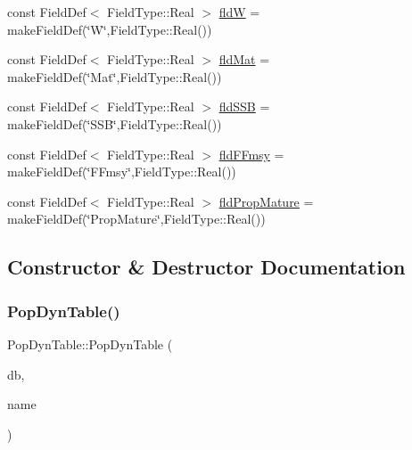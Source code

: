 \begin{DoxyCompactItemize}
\item 
const Field\+Def$<$ Field\+Type\+::\+Real $>$ \mbox{\hyperlink{class_pop_dyn_table_ab53c52a14f297070f8d9425d4ac48a71}{fldW}} = make\+Field\+Def(\char`\"{}W\char`\"{},Field\+Type\+::\+Real())
\item 
const Field\+Def$<$ Field\+Type\+::\+Real $>$ \mbox{\hyperlink{class_pop_dyn_table_aa2b80bf86f409ef0f59a606948ed04e9}{fld\+Mat}} = make\+Field\+Def(\char`\"{}Mat\char`\"{},Field\+Type\+::\+Real())
\item 
const Field\+Def$<$ Field\+Type\+::\+Real $>$ \mbox{\hyperlink{class_pop_dyn_table_a3dc24fac681a019c8cd9ae57457691aa}{fld\+S\+SB}} = make\+Field\+Def(\char`\"{}S\+SB\char`\"{},Field\+Type\+::\+Real())
\item 
const Field\+Def$<$ Field\+Type\+::\+Real $>$ \mbox{\hyperlink{class_pop_dyn_table_a62af20a0049e86c3e963d0825700cf0d}{fld\+F\+Fmsy}} = make\+Field\+Def(\char`\"{}F\+Fmsy\char`\"{},Field\+Type\+::\+Real())
\item 
const Field\+Def$<$ Field\+Type\+::\+Real $>$ \mbox{\hyperlink{class_pop_dyn_table_a72338a05a2e3d98b7ee92238ddbfdc67}{fld\+Prop\+Mature}} = make\+Field\+Def(\char`\"{}Prop\+Mature\char`\"{},Field\+Type\+::\+Real())
\end{DoxyCompactItemize}


\subsection{Constructor \& Destructor Documentation}
\mbox{\label{class_pop_dyn_table_a3c6b649dde4a86af47b4c0ad66e02fc0}} 
\subsubsection{\texorpdfstring{PopDynTable()}{PopDynTable()}}
{\footnotesize\ttfamily Pop\+Dyn\+Table\+::\+Pop\+Dyn\+Table (\begin{DoxyParamCaption}\item[{std\+::shared\+\_\+ptr$<$ sqlite\+::\+S\+Q\+Lite\+Storage $>$}]{db,  }\item[{std\+::string}]{name }\end{DoxyParamCaption})}

\mbox{\label{class_pop_dyn_table_ac5a3c3a5c49cd20bb887224a4a4b819e}} 
